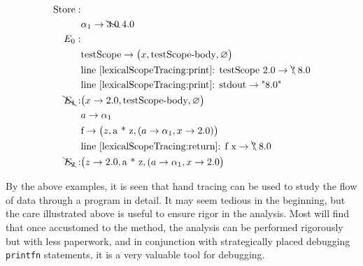 \begin{align*}
  \text{Store}: &\\
  & \alpha_1 \rightarrow \bcancel{3.0}\; 4.0\\
  E_0:&\\
      &\text{testScope} \rightarrow \big(x, \text{testScope-body}, \varnothing\big)\\
      & \text{line~\ref{lexicalScopeTracing:print}: testScope 2.0} \rightarrow \bcancel{\text{?}}\; 8.0\\
      & \text{line~\ref{lexicalScopeTracing:print}: stdout} \rightarrow \text{"8.0"}\\
  \bcancel{E_1}: & \big(x\rightarrow 2.0, \text{testScope-body}, \varnothing\big)\\
      & a \rightarrow \alpha_1\\
      & \text{f} \rightarrow \big(z, \text{a * z}, (a \rightarrow \alpha_1, x\rightarrow 2.0)\big)\\
      & \text{line~\ref{lexicalScopeTracing:return}: f x} \rightarrow \bcancel{\text{?}}\; 8.0\\
  \bcancel{E_2}: & \big(z \rightarrow 2.0, \text{a * z}, (a \rightarrow \alpha_1, x\rightarrow 2.0\big)\\
\end{align*}

By the above examples, it is seen that hand tracing can be used to study the flow of data through a program in detail. It may seem tedious in the beginning, but the care illustrated above is useful to ensure rigor in the analysis. Most will find that once accustomed to the method, the analysis can be performed rigorously but with less paperwork, and in conjunction with strategically placed debugging \lstinline!printfn! statements, it is a very valuable tool for debugging.

